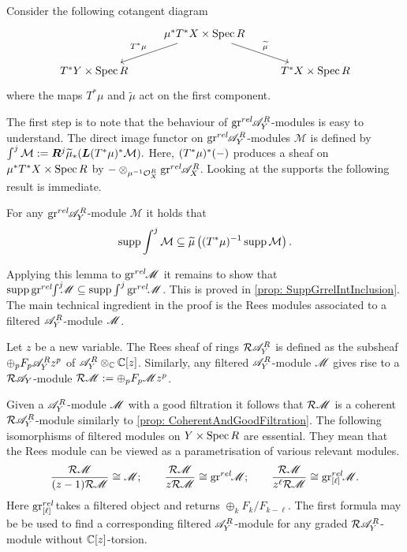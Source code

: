 \noindent
Consider the following cotangent diagram
$$
\begin{tikzcd}
    & \mu^* T^* X\times \Spec R \arrow[swap]{ld}{T^* \mu} \arrow{rd}{\widetilde{\mu}} & \\
    T^* Y\times \Spec R & & T^*X\times \Spec R
\end{tikzcd}
$$
where the maps $T^*\mu$ and $\widetilde{\mu}$ act on the first component.

The first step is to note that the behaviour of $\operatorname{gr}^{rel}\mkern-5mu \mathscr{A}_Y^R$-modules is easy to understand.
The direct image functor on $\operatorname{gr}^{rel}\mkern-5mu \mathscr{A}_Y^R$-modules $\mathcal{M}$ is defined by $\int^j \mathcal{M} :=  \boldsymbol{R}^j \widetilde{\mu}_* ( \boldsymbol{L}(T^*\mu)^*\mathcal{M}).$
Here, $(T^*\mu)^*({-})$ produces a sheaf on $\mu^*T^*X\times \operatorname{Spec} R$ by $ {-}\otimes_{\mu^{-1}\mathcal{O}_X^R} \operatorname{gr}^{rel}\mkern-5mu \mathscr{A}_X^R$.
Looking at the supports the following result is immediate.
\begin{lemma}\label{lem: GrKashiwara}
    For any $\operatorname{gr}^{rel}\mkern-5mu\mathscr{A}_Y^R$-module $\mathcal{M}$ it holds that
    $$\operatorname{supp} \int^j \mathcal{M}\subseteq \widetilde{\mu}\left((T^* \mu)^{-1} \operatorname{supp} \mathcal{M}\right).$$
\end{lemma}
Applying this lemma to $\operatorname{gr}^{rel}\mkern-5mu\mathscr{M}$ it remains to show that $\operatorname{supp}\operatorname{gr}^{rel}\mkern-5mu\int^j \mkern -8mu\mathscr{M}\subseteq \operatorname{supp}\int^j \operatorname{gr}^{rel}\mkern-5mu\mathscr{M}$. This is proved in \cref{prop: SuppGrrelIntInclusion}. The main technical ingredient in the proof is the Rees modules associated to a filtered $\mathscr{A}_Y^R$-module $\mathscr{M}$.
\begin{definition}
    Let $z$ be a new variable. The Rees sheaf of rings $\mathcal{R}\mathscr{A}_Y^R$ is defined as the subsheaf $\oplus_p F_p \mathscr{A}_Y^R z^p $ of $\mathscr{A}_Y^R \otimes_{\mathbb{C}} \mathbb{C}[z]$. Similarly, any filtered $\mathscr{A}_Y^R$-module $\mathscr{M}$ gives rise to a $\mathcal{R}\mathscr{A}_Y$-module $\mathcal{R}\mathscr{M} := \oplus_p F_p \mathscr{M} z^p$.
\end{definition}
Given a $\mathscr{A}_Y^R$-module $\mathscr{M}$ with a good filtration it follows that $\mathcal{R}\mathscr{M}$ is a coherent $\mathcal{R}\mathscr{A}_Y^R$-module similarly to \cref{prop: CoherentAndGoodFiltration}.
The following isomorphisms of filtered modules on $Y\times \operatorname{Spec} R$ are essential.
They mean that the Rees module can be viewed as a parametrisation of various relevant modules.
$$\frac{\mathcal{R}\mathscr{M}}{(z-1)\mathcal{R}\mathscr{M}} \cong \mathscr{M}; \qquad \frac{\mathcal{R}\mathscr{M}}{z\mathcal{R}\mathscr{M}} \cong \operatorname{gr}^{rel}\mkern-5mu \mathscr{M};\qquad \frac{\mathcal{R}\mathscr{M}}{z^\ell\mathcal{R}\mathscr{M}} \cong  \operatorname{gr}_{[\ell]}^{rel}\mkern-5mu\mathscr{M}.$$
Here $\operatorname{gr}_{[\ell]}^{rel}\mkern-5mu$ takes a filtered object and returns $\oplus_k F_{k}/F_{k-\ell}$.
The first formula may be be used to find a corresponding filtered $\mathscr{A}_Y^R$-module for any graded $\mathcal{R}\mathscr{A}_Y^R$-module without $\mathbb{C}[z]$-torsion.

